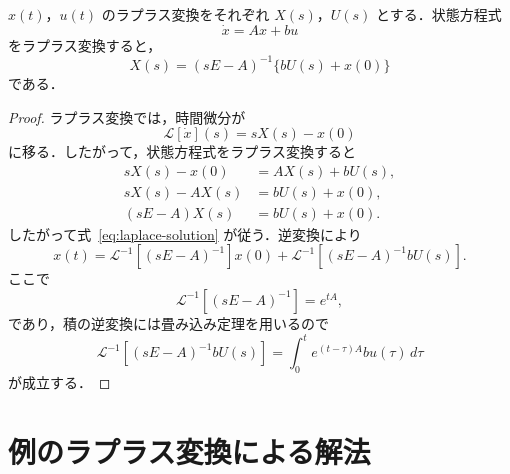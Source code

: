 \documentclass[article,paper=a4paper]{jlreq}
\begin{document}
\begin{prop}
$x(t)$，$u(t)$ のラプラス変換をそれぞれ $X(s)$，$U(s)$ とする．状態方程式
\[
  \dot{x}=Ax+bu
\]
をラプラス変換すると，
\begin{equation}
  X(s)
    =(sE-A)^{-1}\{bU(s)+x(0)\}
  \label{eq:laplace-solution}
\end{equation}
である．
\end{prop}

\begin{proof}
ラプラス変換では，時間微分が
\[
  \mathcal{L}[\dot{x}](s)=sX(s)-x(0)
\]
に移る．したがって，状態方程式をラプラス変換すると
\begin{align*}
  sX(s)-x(0)
    &=AX(s)+bU(s),\\
  sX(s)-AX(s)
    &=bU(s)+x(0),\\
  (sE-A)X(s)
    &=bU(s)+x(0).
\end{align*}
したがって式~\eqref{eq:laplace-solution} が従う．逆変換により
\[
  x(t)
    =
    \mathcal{L}^{-1}\!\left[(sE-A)^{-1}\right]x(0)
    +
    \mathcal{L}^{-1}\!\left[(sE-A)^{-1}bU(s)\right].
\]
ここで
\[
  \mathcal{L}^{-1}\!\left[(sE-A)^{-1}\right]
    =e^{tA},
\]
であり，積の逆変換には畳み込み定理を用いるので
\[
  \mathcal{L}^{-1}\!\left[(sE-A)^{-1}bU(s)\right]
    =
    \int_0^t e^{(t-\tau)A}bu(\tau)\,d\tau
\]
が成立する．
\end{proof}

\section{例のラプラス変換による解法}
\end{document}

